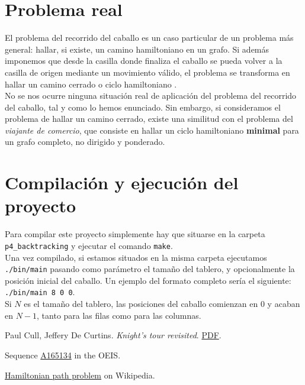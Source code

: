 \documentclass[11pt]{article}
\begin{document}

\section*{Problema real}

El problema del recorrido del caballo es un caso particular de un problema más general: hallar, si existe, un camino hamiltoniano \cite{wiki} en un grafo. Si además imponemos que desde la casilla donde finaliza el caballo se pueda volver a la casilla de origen mediante un movimiento válido, el problema se transforma en hallar un camino cerrado o ciclo hamiltoniano \cite{wiki}.\\

No se nos ocurre ninguna situación real de aplicación del problema del recorrido del caballo, tal y como lo hemos enunciado. Sin embargo, si consideramos el problema de hallar un camino cerrado, existe una similitud con el problema del \textit{viajante de comercio}, que consiste en hallar un ciclo hamiltoniano \textbf{minimal} para un grafo completo, no dirigido y ponderado.\\

\section*{Compilación y ejecución del proyecto}
Para compilar este proyecto simplemente hay que situarse en la carpeta \verb|p4_backtracking| y ejecutar el comando \verb|make|.\\

Una vez compilado, si estamos situados en la misma carpeta ejecutamos \verb|./bin/main| pasando como parámetro el tamaño del tablero, y opcionalmente la posición inicial del caballo. Un ejemplo del formato completo sería el siguiente: \verb|./bin/main 8 0 0|.\\

Si $N$ es el tamaño del tablero, las posiciones del caballo comienzan en $0$ y acaban en $N-1$, tanto para las filas como para las columnas.

\begin{thebibliography}{9}

  Paul Cull, Jeffery De Curtins.
  \emph{Knight's tour revisited}.
   \href{http://www.fq.math.ca/Scanned/16-3/cull.pdf}{PDF}.

  Sequence
  \href{https://oeis.org/A165134}{A165134} in the OEIS.

  \href{https://en.wikipedia.org/wiki/Hamiltonian_path_problem}{Hamiltonian path problem} on Wikipedia.

\end{thebibliography}
\end{document}
